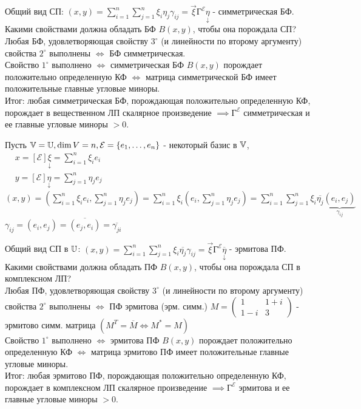 \documentclass[../main.tex]{subfiles}
\begin{document}
Общий вид СП: $(x,y) = \sum_{i  =1}^{n}\sum_{j=1}^{n} \xi_{i}\eta_{j}\gamma_{ij} = \vec{\xi}\text{Г}^{\mathcal{E}}\underset{\downarrow}{\eta}$ - симметрическая БФ. \\ 
\noindent Какими свойствами должна обладать БФ $B(x,y)$, чтобы она порождала СП?\\ 
Любая БФ, удовлетворяющая свойству $3^{\circ}$ (и линейности по второму аргументу) свойства $2^{\circ}$ выполнены $\Leftrightarrow $ БФ симметрическая. \\ 
Свойство $1^{\circ}$ выполнено $\Leftrightarrow $ симметрическая БФ $B(x, y)$ порождает положительно определенную КФ $\Leftrightarrow$ матрица симметрической БФ имеет положительные главные угловые миноры. \\ 
Итог: любая симметрическая БФ, порождающая положительно определенную КФ, порождает в вещественном ЛП скалярное произведение $\implies \text{Г}^{\mathcal{E}}$ симметрическая и ее главные угловые миноры $>0$.
 
Пусть $\mathbb{V} = \mathbb{U} , \dim{V} = n, \mathcal{E}=\{e_{1},\dots,e_{n}\}$ - некоторый базис в $\mathbb{V}$, $\begin{aligned}
    &x=[\mathcal{E}]\underset{\downarrow}{\xi} = \sum_{i    =1}^{n  } \xi_{i}e_{i} \\ 
    &y = [\mathcal{E}]\underset{\downarrow}{\eta}=\sum_{j=1}^{n } \eta_{j}e_{j}
    \end{aligned}$\\ 
    $(x,y) = \left(\sum_{i=1}^{n} \xi_{i}e_{i}, \sum_{j=1}^{n   } \eta_{j}e_{j} \right) = \sum_{i   =1}^{n  } \xi_{i}(e_{i},\sum_{j=1}^{n   } \eta_{j}e_{j}) = \sum_{i  =1}^{n} \sum_{j=1}^{n   } \xi_{i}\overline{\eta_{j}}\underbrace{(e_{i},e_{j})}_{\gamma_{ij}}$ \qquad $\gamma_{ij} = (e_{i},e_{j}) = \overline{(e_{j},e_{i})} = \overline{\gamma_{ji}}$

    Общий вид СП в $\mathbb{U}$: $(x,y) = \sum_{i  =1}^{n}\sum_{j=1}^{n} \xi_{i}\overline{\eta_{j}}\gamma_{ij} = \vec{\xi}\text{Г}^{\mathcal{E}}\underset{\downarrow}{\overline{\eta}}$ - эрмитова ПФ. \\ 
    \noindent Какими свойствами должна обладать ПФ $B(x,y)$, чтобы она порождала СП в комплексном ЛП?\\ 
    Любая ПФ, удовлетворяющая свойству $3^{\circ}$ (и линейности по второму аргументу) свойства $2^{\circ}$ выполнены $\Leftrightarrow $ ПФ эрмитова (эрм. симм.) \; $M=\begin{pmatrix}
        1 & 1+i \\ 
        1-i & 3 
    \end{pmatrix}$ - эрмитово симм. матрица $(M^{T}=\overline{M}\Leftrightarrow M^{*}=M)$\\ 
    Свойство $1^{\circ}$ выполнено $\Leftrightarrow $ эрмитова ПФ $B(x, y)$ порождает положительно определенную КФ $\Leftrightarrow$ матрица эрмитово ПФ имеет положительные главные угловые миноры. \\ 
    Итог: любая эрмитово ПФ, порождающая положительно определенную КФ, порождает в комплексном ЛП скалярное произведение $\implies \text{Г}^{\mathcal{E}}$ эрмитова и ее главные угловые миноры $>0$.
     
\end{document}

